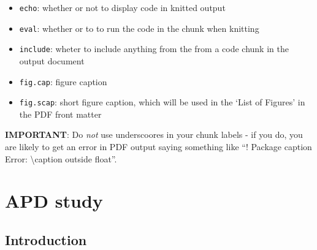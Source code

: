 \documentclass[a4paper, twoside]{templates/ociamthesis}
\providecommand{\tightlist}{%
  \setlength{\itemsep}{0pt}\setlength{\parskip}{0pt}}
\begin{document}
\begin{itemize}
\tightlist
\item
  \texttt{echo}: whether or not to display code in knitted output
\item
  \texttt{eval}: whether or to to run the code in the chunk when knitting
\item
  \texttt{include}: wheter to include anything from the from a code chunk in the output document
\item
  \texttt{fig.cap}: figure caption
\item
  \texttt{fig.scap}: short figure caption, which will be used in the `List of Figures' in the PDF front matter
\end{itemize}

\textbf{IMPORTANT}: Do \emph{not} use underscoores in your chunk labels - if you do, you are likely to get an error in PDF output saying something like ``! Package caption Error: \textbackslash caption outside float''.

\hypertarget{APD-study}{%
\chapter{APD study}\label{APD-study}}


\minitoc 

\hypertarget{introduction-4}{%
\section{Introduction}\label{introduction-4}}
\end{document}
